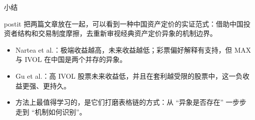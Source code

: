 \documentclass[aspectratio=169,10pt]{beamer}
\begin{document}
\begin{frame}{小结}
	\begin{beamercolorbox}[sep=0.6em,wd=\linewidth,rounded=true]{postit}
		把两篇文章放在一起，可以看到一种中国资产定价的实证范式：借助中国投资者结构和交易制度摩擦，去重新审视经典资产定价异象的机制边界。
	\end{beamercolorbox}
	\vspace{8pt}
	\begin{itemize}
		\item Nartea et al.：极端收益越高，未来收益越低；彩票偏好解释有支持，但 MAX 与 IVOL 在中国是两个并存的异象。
		\item Gu et al.：高 IVOL 股票未来收益低，并且在套利越受限的股票中，这一负收益更强、更持久。
		\item 方法上最值得学习的，是它们打磨表格链的方式：从 ``异象是否存在'' 一步步走到 ``机制如何识别''。
	\end{itemize}
\end{frame}
\end{document}
